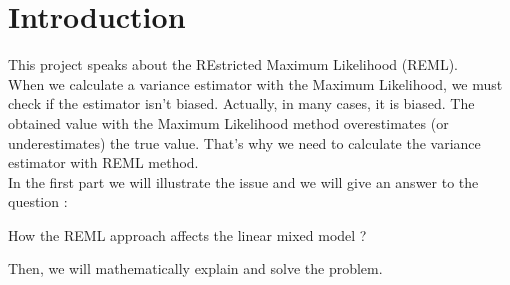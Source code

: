\documentclass{article}
\begin{document}
\sloppy
{}


\section{Introduction}
\label{sec:introduction}
This project speaks about the REstricted Maximum Likelihood (REML).\\
When we calculate a variance estimator with the Maximum Likelihood, we must check if the estimator isn't biased. Actually, in many cases, it is biased. The obtained value with the Maximum Likelihood method overestimates (or underestimates) the true value. That's why we need to calculate the variance estimator with REML method.\\
In the first part we will illustrate the issue and we will give an answer to the question :
\begin{center}
    How the REML approach affects the linear mixed model ?
\end{center}
Then, we will mathematically explain and solve the problem.


\end{document}
